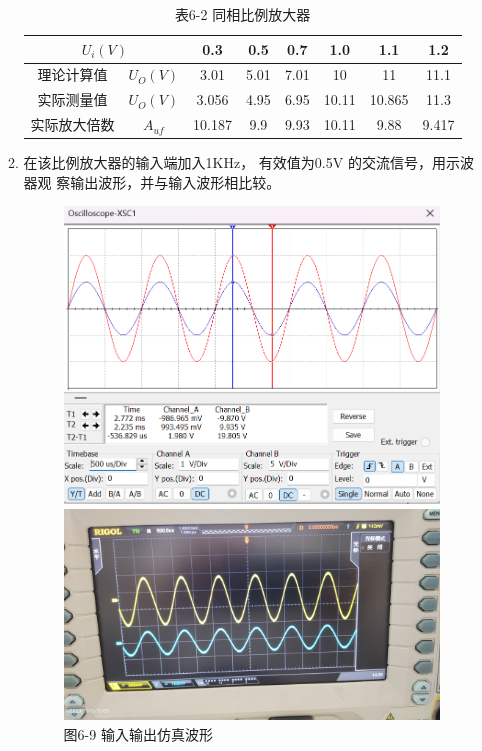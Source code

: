 \documentclass[a4paper,10pt,notitlepage]{article}
\begin{document}
\begin{enumerate}
\begin{enumerate}
\begin{table}[h]
\begin{tabular}{|c|c|c|c|c|c|c|c|}
					\hline
					\multicolumn{2}{|c|}{$U_i(V)$} & 0.3 & 0.5 & 0.7 & 1.0 & 1.1 & 1.2 \\
					\hline
					理论计算值 & $U_O(V)$ & 3.01 & 5.01 & 7.01 & 10 & 11 & 11.1 \\
					\hline
					实际测量值 & $U_O(V)$ & 3.056 & 4.95 & 6.95 & 10.11 & 10.865 & 11.3 \\
					\hline
					实际放大倍数 & $A_{uf}$ & 10.187 & 9.9 & 9.93 & 10.11 & 9.88 & 9.417 \\
					\hline
				\end{tabular}
				\caption*{表6-2 同相比例放大器}
			\end{table}
			\item 在该比例放大器的输入端加入1KHz， 有效值为0.5V 的交流信号，用示波器观
			察输出波形，并与输入波形相比较。
			\newpage
			\begin{figure}[h]
				\raggedright
				\begin{minipage}{0.3\textwidth}
					\centering
					\includegraphics[width=\textwidth]{预习报告/6.png}
					\caption*{图6-9 输入输出仿真波形}
				\end{minipage}
				\qquad
				\begin{minipage}{0.3\textwidth}
					\centering
					\includegraphics[width=\textwidth]{3.jpg}

\end{minipage}
\end{figure}
\end{enumerate}
\end{enumerate}
\end{document}
